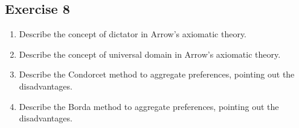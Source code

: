 \documentclass[\main/main.tex]{subfiles}
\begin{document}
\subsection{Exercise 8}
\begin{enumerate}
  \item Describe the concept of dictator in Arrow's axiomatic theory.
  \item Describe the concept of universal domain in Arrow's axiomatic theory.
  \item Describe the Condorcet method to aggregate preferences, pointing out the disadvantages.
  \item Describe the Borda method to aggregate preferences, pointing out the disadvantages.
\end{enumerate}
\end{document}
